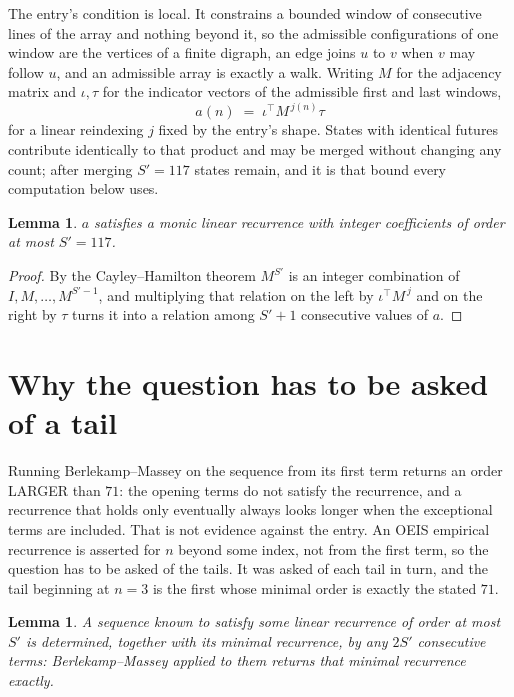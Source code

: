 \documentclass[11pt,a4paper]{article}
\theoremstyle{plain}
\newtheorem{lemma}[theorem]{Lemma}
\theoremstyle{definition}
\begin{document}
The entry's condition is local. It constrains a bounded window of consecutive lines of the
array and nothing beyond it, so the admissible configurations of one window are the vertices of
a finite digraph, an edge joins $u$ to $v$ when $v$ may follow $u$, and an admissible array is
exactly a walk. Writing $M$ for the adjacency matrix and $\iota,\tau$ for the indicator vectors
of the admissible first and last windows,
\[
a(n)\;=\;\iota^{\!\top}M^{\,j(n)}\tau
\]
for a linear reindexing $j$ fixed by the entry's shape. States with identical futures
contribute identically to that product and may be merged without changing any count; after
merging $S'=117$ states remain, and it is that bound every computation below uses.

\begin{lemma}\label{lem:cf}
$a$ satisfies a monic linear recurrence with integer coefficients of order at most $S'=117$.
\end{lemma}

\begin{proof}
By the Cayley--Hamilton theorem $M^{S'}$ is an integer combination of $I,M,\dots,M^{S'-1}$,
and multiplying that relation on the left by $\iota^{\!\top}M^{\,j}$ and on the right by
$\tau$ turns it into a relation among $S'+1$ consecutive values of $a$.
\end{proof}

\section{Why the question has to be asked of a tail}

Running Berlekamp--Massey on the sequence from its first term returns an order LARGER than $71$: the opening terms do not satisfy the recurrence, and a recurrence that holds only eventually always looks longer when the exceptional terms are included. That is not evidence against the entry. An OEIS empirical recurrence is asserted for $n$ beyond some index, not from the first term, so the question has to be asked of the tails. It was asked of each tail in turn, and the tail beginning at $n=3$ is the first whose minimal order is exactly the stated $71$.

\begin{lemma}\label{lem:bm}
A sequence known to satisfy some linear recurrence of order at most $S'$ is determined,
together with its minimal recurrence, by any $2S'$ consecutive terms: Berlekamp--Massey applied
to them returns that minimal recurrence exactly.
\end{lemma}
\end{document}
